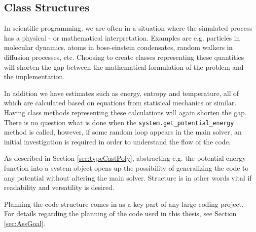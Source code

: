 \subsection{Class Structures}

In scientific programming, we are often in a situation where the simulated process has a physical - or mathematical interpretation. Examples are e.g. particles in molecular dynamics, atoms in bose-einstein condensates, random walkers in diffusion processes, etc. Choosing to create classes representing these quantities will shorten the gap between the mathematical formulation of the problem and the implementation.

In addition we have estimates such as energy, entropy and temperature, all of which are calculated based on equations from statisical mechanics or similar. Having class methods representing these calculations will again shorten the gap. There is no question what is done when the \verb+system.get_potential_energy+ method is called, however, if some random loop appears in the main solver, an initial investigation is required in order to understand the flow of the code.

As described in Section \ref{sec:typeCastPoly}, abstracting e.g. the potential energy function into a system object opens up the possibility of generalizing the code to any potential without altering the main solver. Structure is in other words vital if readability and versatility is desired. 

Planning the code structure comes in as a key part of any large coding project. For details regarding the planning of the code used in this thesis, see Section \ref{sec:AssGoal}.
